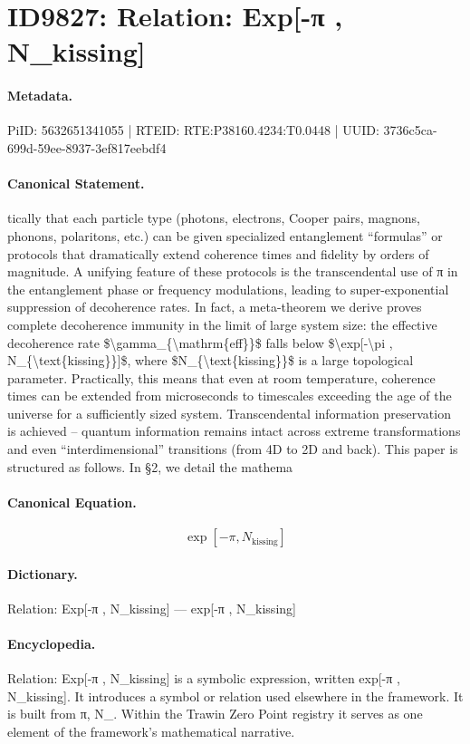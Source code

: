 \section*{ID9827: Relation: Exp[-π , N\_kissing]}
\paragraph{Metadata.}
PiID: 5632651341055 | RTEID: RTE:P38160.4234:T0.0448 | UUID: 3736c5ca-699d-59ee-8937-3ef817eebdf4

\paragraph{Canonical Statement.}
tically that each particle type (photons, electrons, Cooper pairs, magnons, phonons, polaritons, etc.) can be given specialized entanglement “formulas” or protocols that dramatically extend coherence times and fidelity by orders of magnitude. A unifying feature of these protocols is the transcendental use of π in the entanglement phase or frequency modulations, leading to super-exponential suppression of decoherence rates. In fact, a meta-theorem we derive proves complete decoherence immunity in the limit of large system size: the effective decoherence rate \$\textbackslash{}gamma\_\{\textbackslash{}mathrm\{eff\}\}\$ falls below \$\textbackslash{}exp[-\textbackslash{}pi , N\_\{\textbackslash{}text\{kissing\}\}]\$, where \$N\_\{\textbackslash{}text\{kissing\}\}\$ is a large topological parameter. Practically, this means that even at room temperature, coherence times can be extended from microseconds to timescales exceeding the age of the universe for a sufficiently sized system. Transcendental information preservation is achieved – quantum information remains intact across extreme transformations and even “interdimensional” transitions (from 4D to 2D and back). This paper is structured as follows. In §2, we detail the mathema

\paragraph{Canonical Equation.}
\[
\exp[-\pi , N_{\text{kissing}}]
\]

\paragraph{Dictionary.}
Relation: Exp[-π , N\_kissing] — exp[-π , N\_kissing]

\paragraph{Encyclopedia.}
Relation: Exp[-π , N\_kissing] is a symbolic expression, written exp[-π , N\_kissing]. It introduces a symbol or relation used elsewhere in the framework. It is built from π, N\_. Within the Trawin Zero Point registry it serves as one element of the framework's mathematical narrative.
